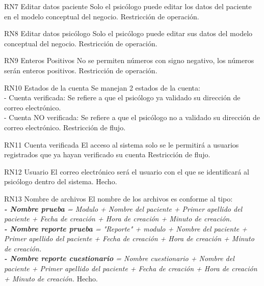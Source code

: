 \begin{BussinesRule}{RN7}{ Editar datos paciente}
\BRitem[Descripción:] Solo el psicólogo puede editar los datos del paciente en el modelo conceptual del negocio.
\BRitem[Tipo:] Restricción de operación.
\end{BussinesRule}

\begin{BussinesRule}{RN8}{ Editar datos psicólogo}
\BRitem[Descripción:] Solo el psicólogo puede editar sus datos del modelo conceptual del negocio.
\BRitem[Tipo:] Restricción de operación.
\end{BussinesRule}

\begin{BussinesRule}{RN9}{ Enteros Positivos}
\BRitem[Descripción:] No se permiten números con signo negativo, los números serán enteros positivos.
\BRitem[Tipo:] Restricción de operación.
\end{BussinesRule}

\begin{BussinesRule}{RN10}{ Estados de la cuenta}
\BRitem[Descripción:] Se manejan 2 estados de la cuenta:\\
- Cuenta verificada: Se refiere a que el psicólogo ya validado su dirección de correo electrónico.\\
- Cuenta NO verificada: Se refiere a que el psicólogo no a validado su dirección de correo electrónico.
\BRitem[Tipo:] Restricción de flujo.
\end{BussinesRule}

\begin{BussinesRule}{RN11}{ Cuenta verificada}
\BRitem[Descripción:] El acceso al sistema solo se le permitirá a usuarios registrados que ya hayan verificado su cuenta
\BRitem[Tipo:] Restricción de flujo.
\end{BussinesRule}

\begin{BussinesRule}{RN12}{ Usuario}
\BRitem[Descripción:] El correo electrónico será el usuario con el que se identificará al psicólogo dentro del sistema.
\BRitem[Tipo:] Hecho.
\end{BussinesRule}

\begin{BussinesRule}{RN13}{ Nombre de archivos}
\BRitem[Descripción:] El nombre de los archivos es conforme al tipo:\\
    \footnotesize
        \textit{
            \textbf{- Nombre prueba} = Modulo + Nombre del paciente + Primer apellido del paciente + Fecha de creación + Hora de creación + Minuto de creación.\\
            \textbf{ - Nombre reporte prueba} = "Reporte" + modulo + Nombre del paciente + Primer apellido del paciente + Fecha de creación + Hora de creación + Minuto de creación.\\
            \textbf{ - Nombre reporte cuestionario} = Nombre cuestionario + Nombre del paciente + Primer apellido del paciente + Fecha de creación + Hora de creación + Minuto de creación.
        }
    \normalsize
\BRitem[Tipo:] Hecho.
\end{BussinesRule}

